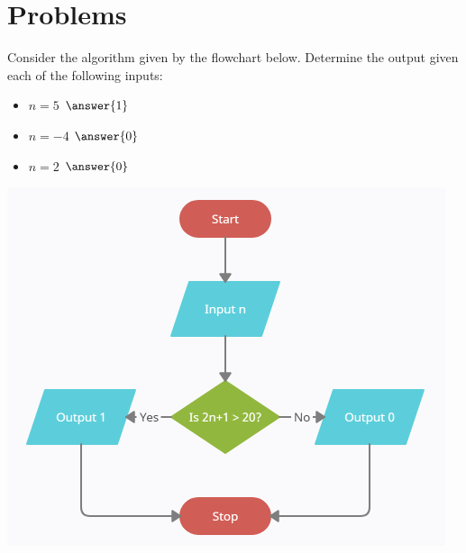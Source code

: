 \documentclass{ximera}
\begin{document}
\section{Problems}

\begin{question}
	Consider the algorithm given by the flowchart below. Determine the output given each of the following inputs:
	\begin{itemize}
		\item $n = 5$ $ \answer{1}$
		\item $n = -4$ $ \answer{0}$
		\item $n = 2$ $\answer{0}$
	\end{itemize}
	\begin{center}
	\includegraphics{20bigger.png}
	\end{center}
\end{question}
\end{document}
